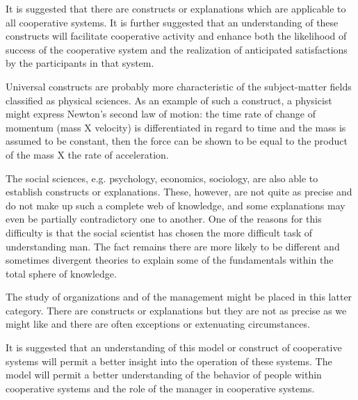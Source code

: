 It is suggested that there are constructs or explanations which are applicable to all cooperative systems. It is further suggested that an understanding of these constructs will facilitate cooperative activity and enhance both the likelihood of success of the cooperative system and the realization of anticipated satisfactions by the participants in that system.

Universal constructs are probably more characteristic of the subject-matter fields classified as physical sciences. As an example of such a construct, a physicist might express Newton’s second law of motion: the time rate of change of momentum (mass X velocity) is differentiated in regard to time and the mass is assumed to be constant, then the force can be shown to be equal to the product of the mass X the rate of acceleration.

The social sciences, e.g. psychology, economics, sociology, are also able to establish constructs or explanations. These, however, are not quite as precise and do not make up such a complete web of knowledge, and some explanations may even be partially contradictory one to another. One of the reasons for this difficulty is that the social scientist has chosen the more difficult task of understanding man. The fact remains there are more likely to be different and sometimes divergent theories to explain some of the fundamentals within the total sphere of knowledge.

The study of organizations and of the management might be placed in this latter category. There are constructs or explanations but they are not as precise as we might like and there are often exceptions or extenuating circumstances.

It is suggested that an understanding of this model or construct of cooperative systems will permit a better insight into the operation of these systems. The model will permit a better understanding of the behavior of people within cooperative systems and the role of the manager in cooperative systems.